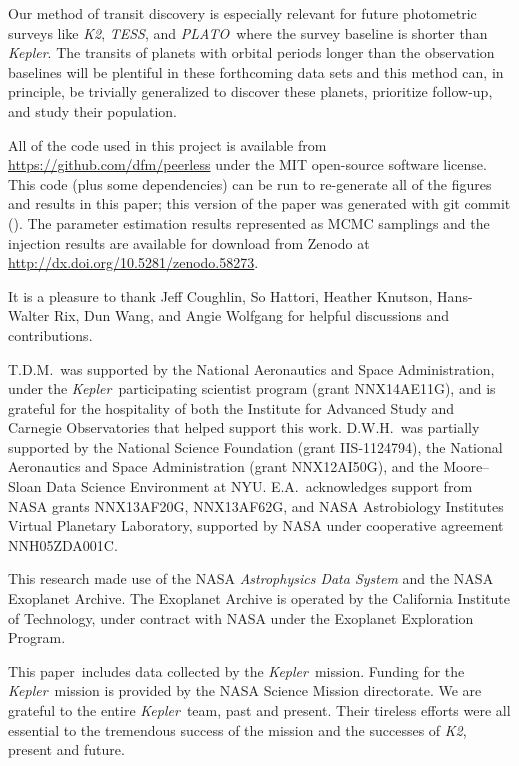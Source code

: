 \documentclass[manuscript, letterpaper]{aastex6}
\newcommand{\project}[1]{\textsl{#1}}
\newcommand{\kepler}{\project{Kepler}}
\newcommand{\KT}{\project{K2}}
\newcommand{\tess}{\project{TESS}}
\newcommand{\plato}{\project{PLATO}}
\newcommand{\paper}{paper}
\newcommand{\datareleaseurl}{\url{http://dx.doi.org/10.5281/zenodo.58273}}
\begin{document}
Our method of transit discovery is especially relevant for future photometric
surveys like \KT, \tess, and \plato\ where the survey baseline is shorter than
\kepler.
The transits of planets with orbital periods longer than the observation
baselines will be plentiful in these forthcoming data sets and this method
can, in principle, be trivially generalized to discover these planets,
prioritize follow-up, and study their population.

\vspace{1.5em}
All of the code used in this project is available from
\url{https://github.com/dfm/peerless} under the MIT open-source software
license.
This code (plus some dependencies) can be run to re-generate all of the
figures and results in this \paper; this version of the paper was generated
with git commit \texttt{\githash} (\gitdate).
The parameter estimation results represented as MCMC samplings and the
injection results are available for download from Zenodo at \datareleaseurl.


\vspace{1.5em}
It is a pleasure to thank
Jeff Coughlin,
So Hattori,
Heather Knutson,
Hans-Walter Rix,
Dun Wang,
and
Angie Wolfgang
for helpful discussions and contributions.

T.D.M.\ was supported by the National Aeronautics and Space
Administration, under the \kepler\ participating
scientist program (grant NNX14AE11G), and is grateful for the
hospitality of both the Institute for Advanced Study and Carnegie
Observatories that helped support this work.
D.W.H.\ was partially supported by the National Science Foundation (grant
IIS-1124794), the National Aeronautics and Space Administration (grant
NNX12AI50G), and the Moore--Sloan Data Science Environment at NYU.
E.A.\ acknowledges support from NASA grants NNX13AF20G, NNX13AF62G, and NASA
Astrobiology Institutes Virtual Planetary Laboratory, supported by NASA under
cooperative agreement NNH05ZDA001C.

This research made use of the NASA \project{Astrophysics Data System} and the
NASA Exoplanet Archive.
The Exoplanet Archive is operated by the California Institute of Technology,
under contract with NASA under the Exoplanet Exploration Program.

This \paper\ includes data collected by the \kepler\ mission. Funding for the
\kepler\ mission is provided by the NASA Science Mission directorate.
We are grateful to the entire \kepler\ team, past and present.
Their tireless efforts were all essential to the tremendous success of the
mission and the successes of \KT, present and future.
\end{document}
